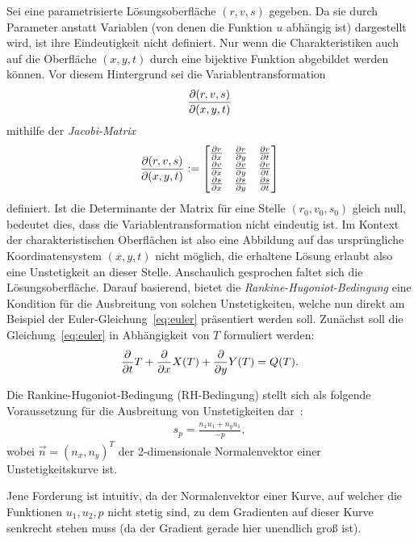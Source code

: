 Sei eine parametrisierte Lösungsoberfläche $(r,v,s)$ gegeben. Da sie durch Parameter anstatt Variablen (von denen die Funktion $u$ abhängig ist) dargestellt wird, ist ihre Eindeutigkeit nicht definiert. Nur wenn die Charakteristiken auch auf die Oberfläche $(x,y,t)$ durch eine bijektive Funktion abgebildet werden können. Vor diesem Hintergrund sei die Variablentransformation
\begin{align*}
    \frac{\partial (r,v,s)}{\partial (x,y,t)}
\end{align*}
mithilfe der \emph{Jacobi-Matrix}
\begin{align}
\label{eq:jacobi}
    \frac{\partial (r,v,s)}{\partial (x,y,t)} := \begin{bmatrix}
        \frac{\partial r}{\partial x} & \frac{\partial r}{\partial y} & \frac{\partial r}{\partial t} \\
        \frac{\partial v}{\partial x} & \frac{\partial v}{\partial y} & \frac{\partial v}{\partial t} \\
        \frac{\partial s}{\partial x} & \frac{\partial s}{\partial y} & \frac{\partial s}{\partial t} \\
    \end{bmatrix}
\end{align}
definiert. Ist die Determinante der Matrix für eine Stelle $(r_0 ,v_0, s_0)$ gleich null, bedeutet dies, dass die Variablentransformation nicht eindeutig ist. Im Kontext der charakteristischen Oberflächen ist also eine Abbildung auf das ursprüngliche Koordinatensystem $(x,y,t)$ nicht möglich, die erhaltene Lösung erlaubt also eine Unstetigkeit an dieser Stelle. Anschaulich gesprochen \glqq faltet \grqq sich die Lösungsoberfläche.
Darauf basierend, bietet die \emph{Rankine-Hugoniot-Bedingung} eine Kondition für die Ausbreitung von solchen Unstetigkeiten, welche nun direkt am Beispiel der Euler-Gleichung~\eqref{eq:euler} präsentiert werden soll.
Zunächst soll die Gleichung~\eqref{eq:euler} in Abhängigkeit von $T$ formuliert werden:
\begin{align*}
    \frac{\partial }{\partial t}T + \frac{\partial }{\partial x}X(T) + \frac{\partial }{\partial y}Y(T) = Q(T).
\end{align*}

\begin{Definitionbox}
    Die Rankine-Hugoniot-Bedingung (RH-Bedingung) stellt sich als folgende Voraussetzung für die Ausbreitung von Unstetigkeiten dar~\cite[Vgl.][S. 18]{vides_simple_2014}:
    \begin{align}
    \label{eq:HN_bedingung}
        s_p = \frac{n_x u_1 + n_y u_1}{-p},
    \end{align}
    wobei $\vec{n} = (n_x, n_y)^T$ der 2-dimensionale Normalenvektor einer Unstetigkeitskurve ist.
\end{Definitionbox}
Jene Forderung ist intuitiv, da der Normalenvektor einer Kurve, auf welcher die Funktionen $u_1 , u_2 , p$ nicht stetig sind, zu dem Gradienten auf dieser Kurve senkrecht stehen muss (da der Gradient gerade hier unendlich groß ist).